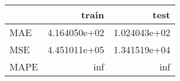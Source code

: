 \begin{tabular}{lrr}
\toprule
{} &         train &          test \\
\midrule
MAE  &  4.164050e+02 &  1.024043e+02 \\
MSE  &  4.451011e+05 &  1.341519e+04 \\
MAPE &           inf &           inf \\
\bottomrule
\end{tabular}

